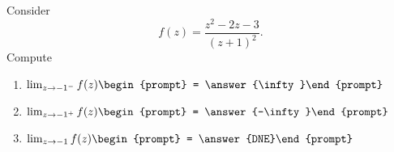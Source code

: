 \documentclass{ximera}
\author{Bart Snapp}
\begin{document}
\begin{exercise}
Consider 
\[
f(z) = \frac{z^2-2 z-3}{(z+1)^2}.
\]
Compute
\begin{enumerate}
\item $\lim_{z\to -1^- } f(z) \begin{prompt} = \answer{\infty}\end{prompt}$
\item $\lim_{z\to -1^+ } f(z) \begin{prompt} = \answer{-\infty}\end{prompt}$
\item $\lim_{z\to -1 } f(z) \begin{prompt} = \answer{DNE}\end{prompt}$
\end{enumerate}
\end{exercise}
\end{document}
